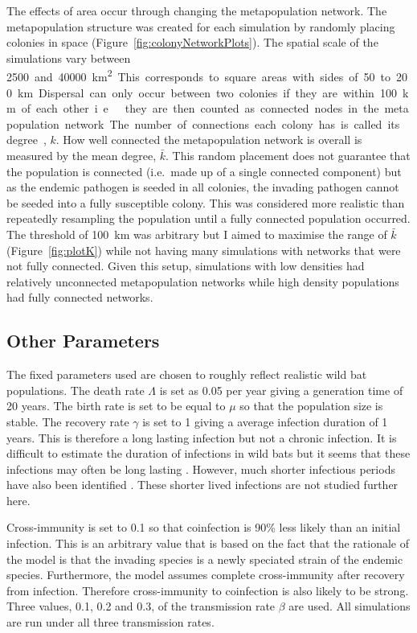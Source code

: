 The effects of area occur through changing the metapopulation network.
The metapopulation structure was created for each simulation by randomly placing colonies in space (Figure~\ref{fig:colonyNetworkPlots}).
The spatial scale of the simulations vary between \SI{2500} and \SI{40000}{\square\kilo\metre}.
This corresponds to square areas with sides of 50 to \SI{200}{\kilo\metre}.
Dispersal can only occur between two colonies if they are within \SI{100}{\kilo\metre} of each other i.e.\ they are then counted as connected nodes in the metapopulation network.
The number of connections each colony has is called its degree, $k$.
How well connected the metapopulation network is overall is measured by the mean degree, $\bar{k}$.
This random placement does not guarantee that the population is connected (i.e.\ made up of a single connected component) but as the endemic pathogen is seeded in all colonies, the invading pathogen cannot be seeded into a fully susceptible colony.
This was considered more realistic than repeatedly resampling the population until a fully connected population occurred.
The threshold of \SI{100}{\kilo\metre} was arbitrary but I aimed to maximise the range  of $\bar{k}$ (Figure~\ref{fig:plotK}) while not having many simulations with networks that were not fully connected.
Given this setup, simulations with low densities had relatively unconnected metapopulation networks while high density populations had fully connected networks.



\subsection{Other Parameters}


The fixed parameters used are chosen to roughly reflect realistic wild bat populations. 
The death rate $\Lambda$ is set as 0.05 per year giving a generation time of 20 years.
The birth rate is set to be equal to $\mu$ so that the population size is stable.
The recovery rate $\gamma$ is set to 1 giving a average infection duration of 1 years. 
This is therefore a long lasting infection but not a chronic infection. 
It is difficult to estimate the duration of infections in wild bats but it seems that these infections may often be long lasting \cite{peel2012henipavirus, plowright2015ecological}.
However, much shorter infectious periods have also been identified \cite{amengual2007temporal}.
These shorter lived infections are not studied further here.

Cross-immunity is set to 0.1 so that coinfection is 90\% less likely than an initial infection.
This is an arbitrary value that is based on the fact that the rationale of the model is that the invading species is a newly speciated strain of the endemic species.
Furthermore, the model assumes complete cross-immunity after recovery from infection.
Therefore cross-immunity to coinfection is also likely to be strong.
Three values, 0.1, 0.2 and 0.3, of the transmission rate $\beta$ are used.
All simulations are run under all three transmission rates.


